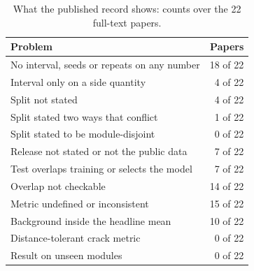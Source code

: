 \begin{table}[ht]\centering\small
\caption{What the published record shows: counts over the 22 full-text papers.}\label{tab:rw_counts}
\begin{tabular}{lr}
\toprule
Problem & Papers \\
\midrule
No interval, seeds or repeats on any number & 18 of 22 \\
Interval only on a side quantity & 4 of 22 \\
Split not stated & 4 of 22 \\
Split stated two ways that conflict & 1 of 22 \\
Split stated to be module-disjoint & 0 of 22 \\
Release not stated or not the public data & 7 of 22 \\
Test overlaps training or selects the model & 7 of 22 \\
Overlap not checkable & 14 of 22 \\
Metric undefined or inconsistent & 15 of 22 \\
Background inside the headline mean & 10 of 22 \\
Distance-tolerant crack metric & 0 of 22 \\
Result on unseen modules & 0 of 22 \\
\bottomrule
\end{tabular}
\end{table}
